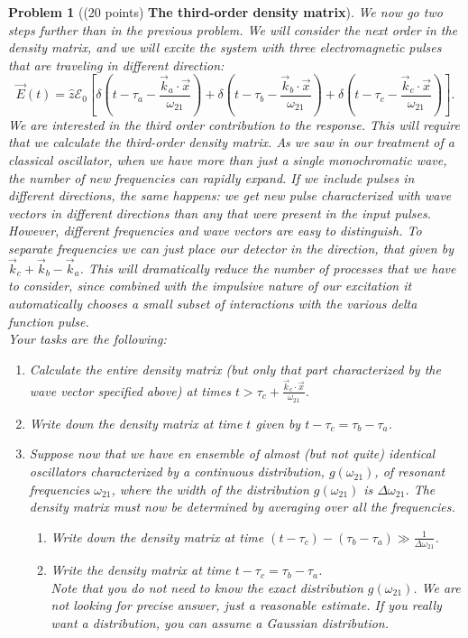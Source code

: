 \documentclass[UTF8,10pt,a4paper]{article}
\theoremstyle{Problem}
\newtheorem{prob}{Problem}
\theoremstyle{Solution}
\begin{document}
\begin{prob}[(20 points) \textbf{The third-order density matrix}]
    We now go two steps further than in the previous problem. We will consider the next order in the density matrix, and we will excite the system with three electromagnetic pulses that are traveling in different direction:
    \[
        \vec{E}(t)=\hat{z}\mathscr{E}_0\left[\delta\left(t-\tau_a-\frac{\vec{k}_a\cdot\vec{x}}{\omega_{21}}\right)+\delta\left(t-\tau_b-\frac{\vec{k}_b\cdot\vec{x}}{\omega_{21}}\right)+\delta\left(t-\tau_c-\frac{\vec{k}_c\cdot\vec{x}}{\omega_{21}}\right)\right].
    \]
    We are interested in the third order contribution to the response. This will require that we calculate the third-order density matrix. As we saw in our treatment of a classical oscillator, when we have more than just a single monochromatic wave, the number of new frequencies can rapidly expand. If we include pulses in different directions, the same happens: we get new pulse characterized with wave vectors in different directions than any that were present in the input pulses. However, different frequencies and wave vectors are easy to distinguish. To separate frequencies we can just place our detector in the direction, that given by $\vec{k}_c+\vec{k}_b-\vec{k}_a$. This will dramatically reduce the number of processes that we have to consider, since combined with the impulsive nature of our excitation it automatically chooses a small subset of interactions with the various delta function pulse.\\
    Your tasks are the following:
    \begin{enumerate}
        \item[(a)] Calculate the entire density matrix (but only that part characterized by the wave vector specified above) at times $t>\tau_c+\frac{\vec{k}_c\cdot\vec{x}}{\omega_{21}}$.
        \item[(b)] Write down the density matrix at time $t$ given by $t-\tau_c=\tau_b-\tau_a$.
        \item[(c)] Suppose now that we have en ensemble of almost (but not quite) identical oscillators characterized by a continuous distribution, $g(\omega_{21})$, of resonant frequencies $\omega_{21}$, where the width of the distribution $g(\omega_{21})$ is $\Delta\omega_{21}$. The density matrix must now be determined by averaging over all the frequencies.
        \begin{enumerate}
            \item[i.] Write down the density matrix at time $(t-\tau_c)-(\tau_b-\tau_a)\gg\frac{1}{\Delta\omega_{21}}$.
            \item[ii.] Write the density matrix at time $t-\tau_c=\tau_b-\tau_a$.\\
            Note that you do not need to know the exact distribution $g(\omega_{21})$. We are not looking for precise answer, just a reasonable estimate. If you really want a distribution, you can assume a Gaussian distribution.
        \end{enumerate}
    \end{enumerate}
\end{prob}
\end{document}

